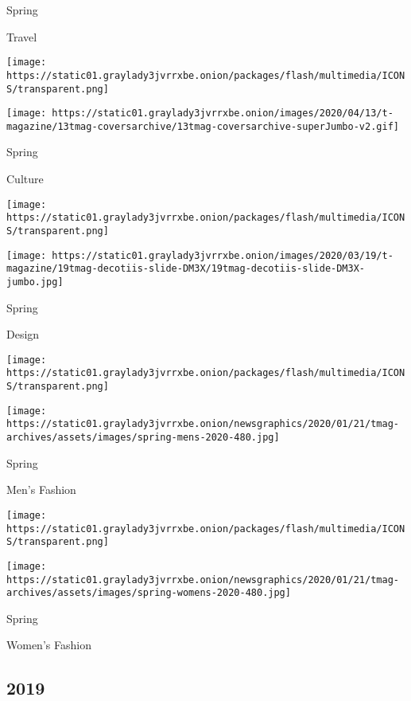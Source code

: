 Spring

Travel

\href{https://www.nytimes3xbfgragh.onion/issue/t-magazine/2020/04/12/ts-april-19-culture-issue}{}

\texttt{[image: https://static01.graylady3jvrrxbe.onion/packages/flash/multimedia/ICONS/transparent.png]}

\texttt{[image: https://static01.graylady3jvrrxbe.onion/images/2020/04/13/t-magazine/13tmag-coversarchive/13tmag-coversarchive-superJumbo-v2.gif]}

Spring

Culture

\href{https://www.nytimes3xbfgragh.onion/issue/t-magazine/2020/03/06/ts-march-22-design-issue}{}

\texttt{[image: https://static01.graylady3jvrrxbe.onion/packages/flash/multimedia/ICONS/transparent.png]}

\texttt{[image: https://static01.graylady3jvrrxbe.onion/images/2020/03/19/t-magazine/19tmag-decotiis-slide-DM3X/19tmag-decotiis-slide-DM3X-jumbo.jpg]}

Spring

Design

\href{https://www.nytimes3xbfgragh.onion/issue/t-magazine/2020/02/21/ts-march-8-mens-fashion-issue}{}

\texttt{[image: https://static01.graylady3jvrrxbe.onion/packages/flash/multimedia/ICONS/transparent.png]}

\texttt{[image: https://static01.graylady3jvrrxbe.onion/newsgraphics/2020/01/21/tmag-archives/assets/images/spring-mens-2020-480.jpg]}

Spring

Men's Fashion

\href{https://www.nytimes3xbfgragh.onion/issue/t-magazine/2020/02/06/ts-feb-23-womens-fashion-issue}{}

\texttt{[image: https://static01.graylady3jvrrxbe.onion/packages/flash/multimedia/ICONS/transparent.png]}

\texttt{[image: https://static01.graylady3jvrrxbe.onion/newsgraphics/2020/01/21/tmag-archives/assets/images/spring-womens-2020-480.jpg]}

Spring

Women's Fashion

\hypertarget{2019}{%
\subsection{2019}\label{2019}}

